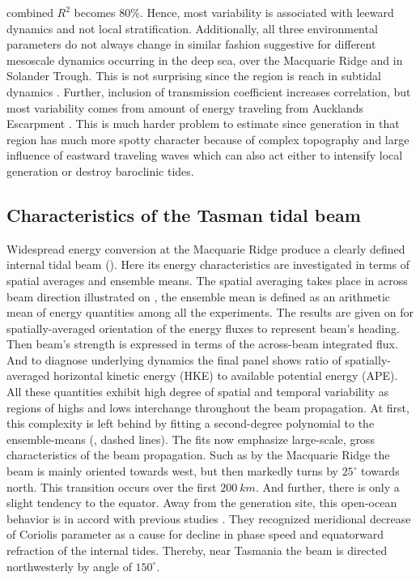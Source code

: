 \documentclass[12pt]{article}
\begin{document}
combined $R^2$ becomes $80\%$. Hence, most variability is associated with leeward dynamics and not 
local stratification. Additionally, all three environmental parameters do not always change in 
similar fashion suggestive for different mesoscale dynamics occurring in the deep sea, over 
the Macquarie Ridge and in Solander Trough. This is not surprising since the region is reach in 
subtidal dynamics \citep{smith2013interaction}. Further, inclusion of 
transmission coefficient increases correlation, but most variability comes from amount of energy 
traveling from Aucklands Escarpment 
. This is much harder problem to estimate since generation in that 
region has much more spotty character  because of complex topography and large 
influence of eastward traveling waves which can also act either to intensify local generation or 
destroy baroclinic tides.

\newpage
\subsection{Characteristics of the Tasman tidal beam}
Widespread energy conversion at the Macquarie Ridge produce a clearly defined internal tidal beam 
(). Here its energy characteristics are investigated in terms of spatial 
averages and ensemble means. The spatial averaging takes place in across beam direction 
illustrated on , the ensemble mean is defined as an arithmetic mean of energy 
quantities among all the experiments. The results are given on  for 
spatially-averaged orientation of the energy fluxes to represent beam's heading. Then beam's 
strength is expressed in terms of the across-beam integrated flux. And to diagnose underlying 
dynamics the final panel shows ratio of spatially-averaged horizontal kinetic energy (HKE) to 
available potential energy (APE). All 
these quantities exhibit high degree of spatial and temporal variability as regions of 
highs and lows interchange throughout the beam propagation. At first, this complexity is left 
behind by fitting a second-degree polynomial to the ensemble-means (, 
dashed lines). The fits now emphasize large-scale, gross characteristics of the beam propagation. 
Such as by the Macquarie Ridge the beam is mainly oriented towards west, but then markedly turns by 
$25^\circ$ towards north. This transition occurs over the first $200~km$. And further, there is 
only a slight tendency to the equator. Away from the generation site, this open-ocean behavior is 
in accord with previous studies \citep{cummins2001north, rainville2006propagation, 
zhao2018satellite}. They recognized meridional decrease of Coriolis parameter as a cause for 
decline in phase speed and equatorward refraction of the internal tides. Thereby, near Tasmania the 
beam is directed northwesterly by angle of $150^\circ$.\\
\end{document}
